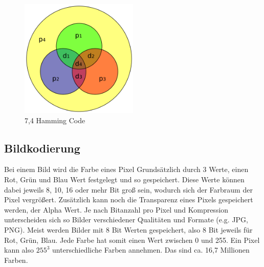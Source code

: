\begin{figure}[H]
    \centering
    \includegraphics[width=0.5\textwidth]{images/hamming8.4.png}
    \caption{7,4 Hamming Code}
\end{figure}

\subsection{Bildkodierung}

Bei einem Bild wird die Farbe eines Pixel Grundsätzlich durch 3 Werte, einen Rot,
Grün und Blau Wert festgelegt und so gespeichert. Diese Werte können dabei jeweils
8, 10, 16 oder mehr Bit groß sein, wodurch sich der Farbraum der Pixel vergrößert.
Zusätzlich kann noch die Transparenz eines Pixels gespeichert werden, der Alpha Wert.
Je nach Bitanzahl pro Pixel und Kompression unterscheiden sich so Bilder verschiedener
Qualitäten und Formate (e.g. JPG, PNG). Meist werden Bilder mit 8 Bit Werten gespeichert,
also 8 Bit jeweils für Rot, Grün, Blau. Jede Farbe hat somit einen Wert zwischen 0 und 255.
Ein Pixel kann also $255^3$ unterschiedliche Farben annehmen. Das sind ca. 16,7 Millionen
Farben.

